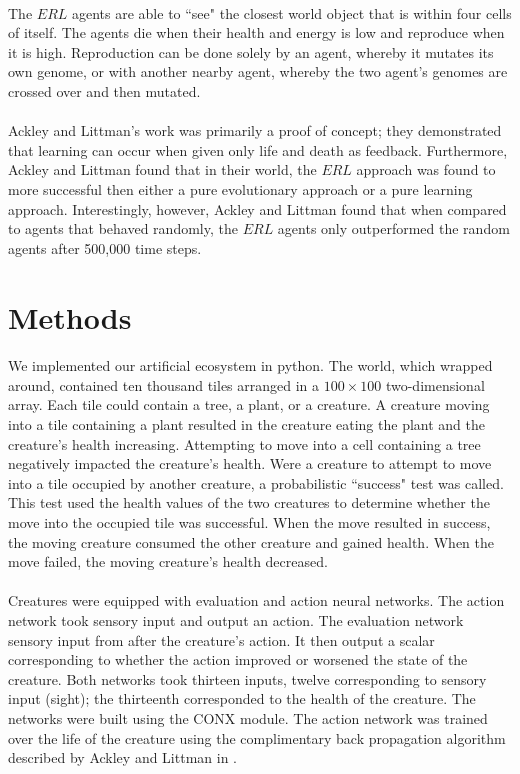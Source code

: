 \documentclass[12pt]{report}
\begin{document}
\paragraph{} The $ERL$ agents are able to ``see" the closest world object that is within four cells of itself. The agents die when their health and energy is low and reproduce when it is high. Reproduction can be done solely by an agent, whereby it mutates its own genome, or with another nearby agent, whereby the two agent's genomes are crossed over and then mutated.
\paragraph{} Ackley and Littman's work was primarily a proof of concept; they demonstrated that learning can occur when given only life and death as feedback. Furthermore, Ackley and Littman found that in their world, the $ERL$ approach was found to more successful then either a pure evolutionary approach or a pure learning approach. Interestingly, however, Ackley and Littman  found that when compared to agents that behaved randomly, the $ERL$ agents only outperformed the random agents after 500,000 time steps. 

\section*{Methods}
\paragraph{} We implemented our artificial ecosystem in python. The world, which wrapped around, contained ten thousand tiles arranged in a $100 \times 100$ two-dimensional array. Each tile could contain a tree, a plant, or a creature. A creature moving into a tile containing a plant resulted in the creature eating the plant and the creature's health increasing. Attempting to move into a cell containing a tree negatively impacted the creature's health. Were a creature to attempt to move into a tile occupied by another creature, a probabilistic ``success" test was called. This test used the health values of the two creatures to determine whether the move into the occupied tile was successful. When the move resulted in success, the moving creature consumed the other creature and gained health. When the move failed, the moving creature's health decreased.
\paragraph{}  Creatures were equipped with evaluation and action neural networks. The action network took sensory input and output an action. The evaluation network sensory input from after the creature's action. It then output a scalar corresponding to whether the action improved or worsened the state of the creature. Both networks took thirteen inputs, twelve corresponding to sensory input (sight); the thirteenth corresponded to the health of the creature. The networks were built using the CONX module. The action network was trained over the life of the creature using the complimentary back propagation algorithm described by Ackley and Littman in \cite{erl}. 
\end{document}
